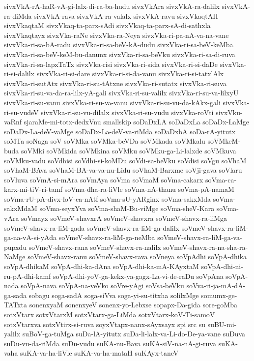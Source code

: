 {sivxVkA-rA-haR-vA-gi-lalx-di-ra-ba-hudu
sivxVkAra
sivxVkA-ra-dalilx
sivxVkA-ra-diMda
sivxVkA-rava
sivxVkA-ra-valalx
sivxVkA-ravu
sivxVkaqtAH
sivxVkaqtaM
sivxVkaq-ta-parx-sAdi
sivxVkaq-ta-parx-sA-di-sathxla
sivxVkaqtayx
sivxVka-raNe
sivxVka-ra-Neya
sivxVka-ri-pa-nA-va-na-vane
sivxVka-ri-sa-bA-radu
sivxVka-ri-sa-beV-kA-dudu
sivxVka-ri-sa-beV-keMba
sivxVka-ri-sa-beV-keM-bu-danunx
sivxVka-ri-sa-beVku
sivxVka-ri-sa-di-ruva
sivxVka-ri-sa-lapxTaTx
sivxVka-risi
sivxVka-ri-sida
sivxVka-ri-si-daDe
sivxVka-ri-si-dalilx
sivxVka-ri-si-dare
sivxVka-ri-si-da-vanu
sivxVka-ri-si-tatxlAlx
sivxVka-ri-sutAtx
sivxVka-ri-su-tAtxne
sivxVka-ri-sutatx
sivxVka-ri-suva
sivxVka-ri-su-va-da-ra-lilx-yA-gali
sivxVka-ri-su-valilx
sivxVka-ri-su-va-lilxyU
sivxVka-ri-su-vanu
sivxVka-ri-su-va-vanu
sivxVka-ri-su-vu-da-kAkx-gali
sivxVka-ri-su-vudeV
sivxVka-ri-su-vu-dilalx
sivxVka-ri-su-vudu
sivxVka-roVti
sivxVku-vaRnf
sjaraMe-mi-totx-dedxVnu
smallskip
soDaDxLA
soDaDxLa
soDaDx-LaMge
soDaDx-La-deV-vaMge
soDaDx-La-deV-va-riMda
soDaDxbA
soDa-rA-yitutx
soMTa
soNaga
soV
soVMka
soVMka-beVDa
soVMkada
soVMkalu
soVMkeM-buda
soVMki
soVMkida
soVMkina
soVMku
soVMku-ga-Li-lalxde
soVMkuva
soVMku-vadu
soVdhisi
soVdhi-si-koMDu
soVdi-sa-beVku
soVdisi
soVgu
soVhaM
soVhaM-BAva
soVhaM-BA-va-va-nu-Lidu
soVhaM-Barxme
soVji-gava
soVlaru
soVluva
soVmA-si-mAra
soVmAya
soVma
soVmaM
soVma-cakarx
soVma-ca-karx-mi-tiV-ri-tamf
soVma-dha-ra-liVle
soVma-nA-thanu
soVma-pA-namaM
soVma-rU-pA-divx-loV-ca-nAtf
soVma-sU-yARginx
soVma-sakxMda
soVma-sakxMdaM
soVma-seyxYva
soVma-shaM-Bu-viMge
soVma-sheV-Kara
soVma-vAra
soVmayx
soVmeV-shavxrA
soVmeV-shavxra
soVmeV-shavx-ra-liMga
soVmeV-shavx-ra-liM-gada
soVmeV-shavx-ra-liM-ga-dalilx
soVmeV-shavx-ra-liM-ga-na-vA-si-yAda
soVmeV-shavx-ra-liM-ga-neMba
soVmeV-shavx-ra-liM-ga-va-pupxdu
soVmeV-shavx-rana
soVmeV-shavx-ra-nalilx
soVmeV-shavx-ra-na-sha-ra-NaMge
soVmeV-shavx-ranu
soVmeV-shavx-rava
soVneya
soVpAdhi
soVpA-dhika
soVpA-dhikaM
soVpA-dhi-ka-dAna
soVpA-dhi-ka-mA-KAyxtaM
soVpA-dhi-ni-ru-pA-dhi-kamf
soVpA-dhi-yoV-ga-kekx-ya-gagx-La-vi-de-raDu
soVpAna
soVpA-nada
soVpA-nava
soVpA-na-veVko
soVre-yAgi
soVsa-beVku
soVva-ri-ja-mA-dA-ga-sada
sobagu
soga-sadA
soga-siVva
soga-yi-su-titxha
solilxMge
somumx-ge-TATxta
sonenxyaM
sonenxyeV
sonenx-yo-Lebxse
sopapx-Da-gida
sore-goMba
sotxVtarx
sotxVtarxM
sotxVtarx-ga-LiMda
sotxVtarx-koV-Ti-samoV
sotxVtarxva
sotxVtirx-si-ruva
soyxVtapx-nanx-sAyxsayx
spi
src
su
suBU-mi-yalilx
suBoV-ga-tuMga
suDa-lA-yitutx
suDa-li-lalx-va-Li-do-De-ya-vane
suDuva
suDu-vu-da-riMda
suDu-vudu
suKA-nu-Bava
suKA-siV-na-nA-gi-ruva
suKA-vaha
suKA-va-ha-liVle
suKA-va-ha-mataH
suKAyx-taneV
}
